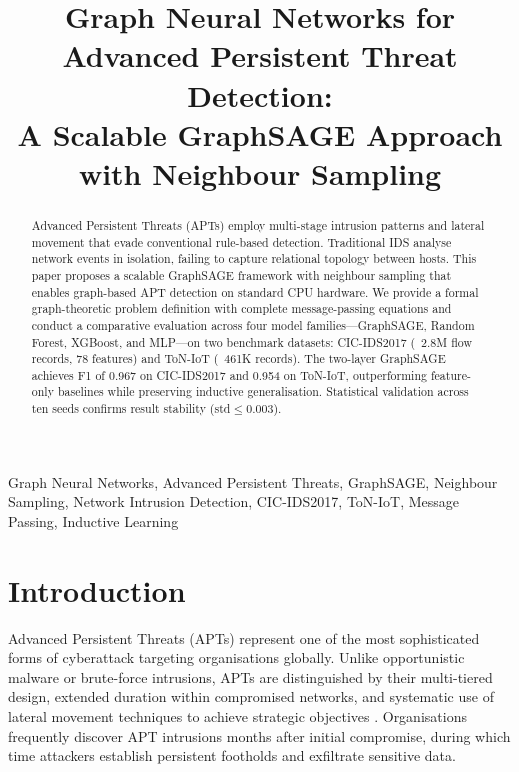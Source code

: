 \documentclass[conference]{IEEEtran}
\title{Graph Neural Networks for Advanced Persistent Threat Detection:\\A Scalable GraphSAGE Approach with Neighbour Sampling}
\author{
\IEEEauthorblockN{Manjunath Shivalingappa Javali}
\IEEEauthorblockA{Student ID: x24213896\\
H9AIMLC -- AI/ML in Cybersecurity\\
National College of Ireland\\
Dublin, Ireland\\
x24213896@student.ncirl.ie}
}
\begin{document}
\maketitle

\begin{abstract}
Advanced Persistent Threats (APTs) employ multi-stage intrusion patterns and lateral movement that evade conventional rule-based detection. Traditional IDS analyse network events in isolation, failing to capture relational topology between hosts. This paper proposes a scalable GraphSAGE framework with neighbour sampling that enables graph-based APT detection on standard CPU hardware. We provide a formal graph-theoretic problem definition with complete message-passing equations and conduct a comparative evaluation across four model families---GraphSAGE, Random Forest, XGBoost, and MLP---on two benchmark datasets: CIC-IDS2017 (~2.8M flow records, 78 features) and ToN-IoT (~461K records). The two-layer GraphSAGE achieves F1 of 0.967 on CIC-IDS2017 and 0.954 on ToN-IoT, outperforming feature-only baselines while preserving inductive generalisation. Statistical validation across ten seeds confirms result stability (std$\leq$0.003).
\end{abstract}

\begin{IEEEkeywords}
Graph Neural Networks, Advanced Persistent Threats, GraphSAGE, Neighbour
Sampling, Network Intrusion Detection, CIC-IDS2017, ToN-IoT, Message Passing, Inductive Learning
\end{IEEEkeywords}

\section{Introduction}

Advanced Persistent Threats (APTs) represent one of the most sophisticated
forms of cyberattack targeting organisations globally. Unlike opportunistic
malware or brute-force intrusions, APTs are distinguished by their multi-tiered
design, extended duration within compromised networks, and systematic use of
lateral movement techniques to achieve strategic objectives
\cite{gamage2025,hutchins2011}. Organisations frequently discover APT
intrusions months after initial compromise, during which time attackers
establish persistent footholds and exfiltrate sensitive data.
\end{document}
